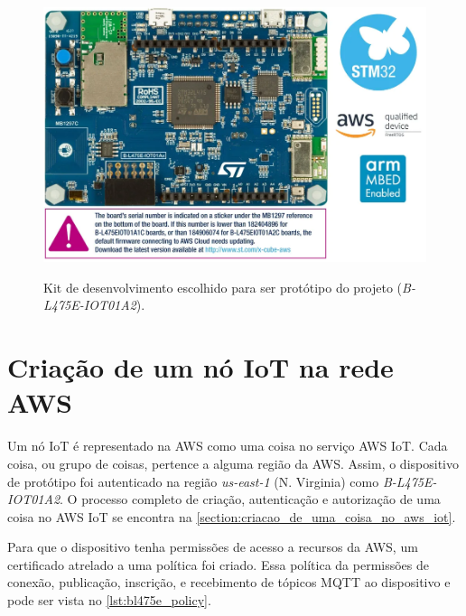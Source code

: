 \begin{figure}[htbp]
    \centering
    \caption{Kit de desenvolvimento escolhido para ser protótipo do projeto (\textit{B-L475E-IOT01A2}).}
    \includegraphics[scale=0.7]{Imagens/B-L475E-IOT01A2.png}
    \label{fig:B-L475E-IOT01A2}
\end{figure}

\section{Criação de um nó IoT na rede AWS}\label{section:criacao_de_um_no_iot_na_rede_aws}

Um nó IoT é representado na AWS como uma coisa no serviço AWS IoT. Cada coisa, ou grupo de coisas, pertence a alguma região da AWS. Assim, o dispositivo de protótipo foi autenticado na região \textit{us-east-1} (N. Virginia) como \textit{B-L475E-IOT01A2}. O processo completo de criação, autenticação e autorização de uma coisa no AWS IoT se encontra na \autoref{section:criacao_de_uma_coisa_no_aws_iot}.

Para que o dispositivo tenha permissões de acesso a recursos da AWS, um certificado atrelado a uma política foi criado. Essa política da permissões de conexão, publicação, inscrição, e recebimento de tópicos MQTT ao dispositivo e pode ser vista no \autoref{lst:bl475e_policy}.

